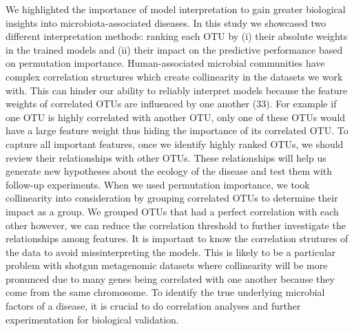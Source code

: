 \documentclass[11pt,]{article}
\begin{document}
We highlighted the importance of model interpretation to gain greater
biological insights into microbiota-associated diseases. In this study
we showcased two different interpretation methods: ranking each OTU by
(i) their absolute weights in the trained models and (ii) their impact
on the predictive performance based on permutation importance.
Human-associated microbial communities have complex correlation
structures which create collinearity in the datasets we work with. This
can hinder our ability to reliably interpret models because the feature
weights of correlated OTUs are influenced by one another (33). For
example if one OTU is highly correlated with another OTU, only one of
these OTUs would have a large feature weight thus hiding the importance
of its correlated OTU. To capture all important features, once we
identify highly ranked OTUs, we should review their relationships with
other OTUs. These relationships will help us generate new hypotheses
about the ecology of the disease and test them with follow-up
experiments. When we used permutation importance, we took collinearity
into consideration by grouping correlated OTUs to determine their impact
as a group. We grouped OTUs that had a perfect correlation with each
other however, we can reduce the correlation threshold to further
investigate the relationships among features. It is important to know
the correlation strutures of the data to avoid missinterpreting the
models. This is likely to be a particular problem with shotgun
metagenomic datasets where collinearity will be more pronunced due to
many genes being correlated with one another because they come from the
same chromosome. To identify the true underlying microbial factors of a
disease, it is crucial to do correlation analyses and further
experimentation for biological validation.
\end{document}
